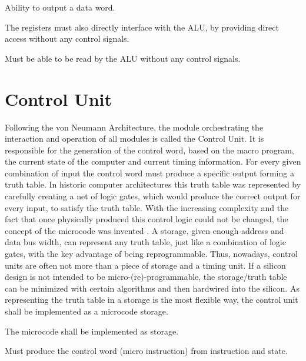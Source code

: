 \begin{feat-requirement}
  Ability to output a data word.
\end{feat-requirement}

The registers must also directly interface with the ALU, by providing direct access without any control signals. 

\begin{arch-requirement} \label{req:register-direct-access}
  Must be able to be read by the ALU without any control signals.
\end{arch-requirement}


\section{Control Unit}
Following the von Neumann Architecture, the module orchestrating the interaction and operation of all modules is called the Control Unit. It is responsible for the generation of the control word, based on the macro program, the current state of the computer and current timing information. For every given combination of input the control word must produce a specific output forming a truth table. In historic computer architectures this truth table was represented by carefully creating a net of logic gates, which would produce the correct output for every input, to satisfy the truth table. With the increasing complexity and the fact that once physically produced this control logic could not be changed, the concept of the microcode was invented \cite{malvino1983a}. A storage, given enough address and data bus width, can represent any truth table, just like a combination of logic gates, with the key advantage of being reprogrammable. Thus, nowadays, control units are often not more than a piece of storage and a timing unit. If a silicon design is not intended to be micro-(re)-programmable, the storage/truth table can be minimized with certain algorithms and then hardwired into the silicon. As representing the truth table in a storage is the most flexible way, the control unit shall be implemented as a microcode storage.
\begin{arch-requirement}
  The microcode shall be implemented as storage.
\end{arch-requirement}

\begin{arch-requirement} \label{req:cw-from-instr}
  Must produce the control word (micro instruction) from instruction and state.
\end{arch-requirement}

